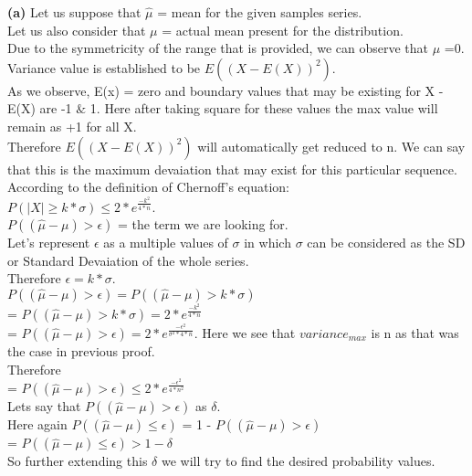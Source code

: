 \documentclass[11pt]{article}
\renewcommand\part[1]{\vspace{.10in}\textbf{(#1)}}
\begin{document}
\part{a}
Let us suppose that $\hat{\mu}$ = mean for the given samples series.\\
Let us also consider that $\mu$ = actual mean present for the distribution.\\
Due to the symmetricity of the range that is provided, we can observe that $\mu$ =0.\\
Variance value is established to be $E((X - E(X)) ^ 2)$.\\
As we observe, E(x) = zero and boundary values that may be existing for X - E(X) are -1 $\&$ 1. Here after taking square for these values the max value will remain as +1 for all X.\\
Therefore $E((X - E(X)) ^ 2)$ will automatically get reduced to n. We can say that this is the maximum devaiation that may exist for this particular sequence.\\
According to the definition of Chernoff's equation:\\
$P(|X| \geq k* \sigma) \leq 2 * e^{\frac{-k^2}{4*n}}$.\\
$P((\hat{\mu} - \mu) > \epsilon)$ = the term we are looking for.\\ Let's represent $\epsilon$ as a multiple values of $\sigma$ in which $\sigma$ can be considered as the SD or Standard Devaiation of the whole series.\\
Therefore $\epsilon = k * \sigma$.\\
$P((\hat{\mu} - \mu) > \epsilon) = P((\hat{\mu} - \mu) > k * \sigma)$\\
= $P((\hat{\mu} - \mu) > k * \sigma) = 2 * e^ {\frac{-k^2}{4 * n}}$\\
= $P((\hat{\mu} - \mu) > \epsilon) = 2 * e^ {\frac{-\epsilon ^ 2}{\sigma ^ 2 * 4 * n}}$.
Here we see that $variance_{max}$ is n as that was the case in previous proof.\\ Therefore\\
= $P((\hat{\mu} - \mu) > \epsilon) \leq 2 * e^ {\frac{-\epsilon ^ 2}{4 * n^2}}$\\
Lets say that $P((\hat{\mu} - \mu) > \epsilon)$ as $\delta.$\\
Here again $P((\hat{\mu} - \mu) \leq \epsilon)$ = 1 - $P((\hat{\mu} - \mu) > \epsilon)$\\
= $P((\hat{\mu} - \mu) \leq \epsilon) > 1 - \delta$\\
So further extending this $\delta$ we will try to find the desired probability values.\\
\end{document}

